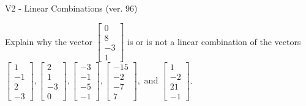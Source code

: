 \begin{exercise}
  \begin{exerciseTitle}V2 - Linear Combinations (ver. 96)\end{exerciseTitle}
  \begin{exerciseStatement}
    Explain why the vector \(\left[\begin{array}{c}
0 \\
8 \\
-3 \\
1
\end{array}\right]\)  is or is not a linear 
	combination of the vectors \(\left[\begin{array}{c}
1 \\
-1 \\
2 \\
-3
\end{array}\right] , \left[\begin{array}{c}
2 \\
1 \\
-3 \\
0
\end{array}\right] , \left[\begin{array}{c}
-3 \\
-1 \\
-5 \\
-1
\end{array}\right] , \left[\begin{array}{c}
-15 \\
-2 \\
-7 \\
7
\end{array}\right] , \text{ and } \left[\begin{array}{c}
1 \\
-2 \\
21 \\
-1
\end{array}\right]\).
	



\end{exerciseStatement}
\end{exercise}
